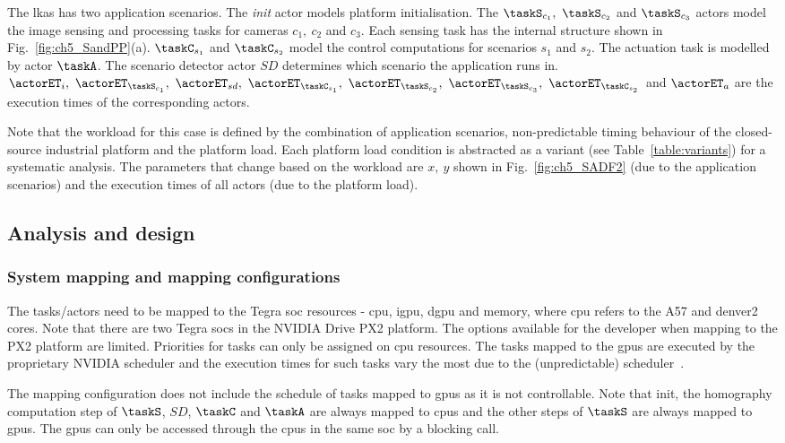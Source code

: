 The \gls{lkas} has two application scenarios. The \textit{init} actor models platform initialisation. The $\taskS_{c_1},\ \taskS_{c_2}$ and $\taskS_{c_3}$ actors model the image sensing and processing tasks for cameras $c_1,\ c_2$ and $c_3$. Each sensing task has the internal structure shown in Fig.~\ref{fig:ch5_SandPP}(a). $\taskC_{s_1}$ and $\taskC_{s_2}$ model the control computations for scenarios $s_1$ and $s_2$. 
The actuation task is modelled by actor $\taskA$. The scenario detector actor $SD$ determines which scenario the application runs in. $\actorET_i,\ \actorET_{\taskS_{c_1}},\ \actorET_{sd},\ \actorET_{\taskC_{s_1}},\ \actorET_{\taskS_{c_2}},\ \actorET_{\taskS_{c_3}},\ \actorET_{\taskC_{s_2}}$ and $\actorET_a$ are the execution times of the corresponding actors.

Note that the workload for this case is defined by the combination of application scenarios, non-predictable timing behaviour of the closed-source industrial platform and the platform load. Each platform load condition is abstracted as a variant (see Table~\ref{table:variants}) for a systematic analysis.
The parameters that change based on the workload are $x,\ y$ shown in Fig.~\ref{fig:ch5_SADF2} (due to the application scenarios) and the execution times of all actors (due to the platform load).

\subsection{Analysis and design}
\subsubsection{System mapping and mapping configurations}
The tasks/actors need to be mapped to the Tegra \gls{soc} resources - \gls{cpu}, \gls{igpu}, \gls{dgpu} and memory, where \gls{cpu} refers to the A57 and denver2 cores. Note that there are two Tegra \glspl{soc} in the NVIDIA Drive PX2 platform. The options available for the developer when mapping to the PX2 platform are limited. Priorities for tasks can only be assigned on \gls{cpu} resources. The tasks mapped to the \glspl{gpu} are executed by the proprietary NVIDIA scheduler and the execution times for such tasks vary the most due to the (unpredictable) scheduler~\cite{intro_nvidia_no_predict}. 

The mapping configuration does not include the schedule of tasks mapped to \glspl{gpu} as it is not controllable. Note that init, the homography computation step of $\taskS$, $SD$, $\taskC$ and $\taskA$ are always mapped to \glspl{cpu} and the other steps of $\taskS$ are always mapped to \glspl{gpu}. The \glspl{gpu} can only be accessed through the \glspl{cpu} in the same \gls{soc} by a blocking call.

